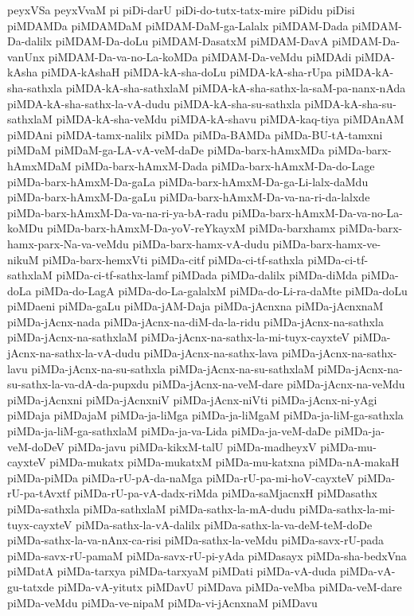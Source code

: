 {peyxVSa
peyxVvaM
pi
piDi-darU
piDi-do-tutx-tatx-mire
piDidu
piDisi
piMDAMDa
piMDAMDaM
piMDAM-DaM-ga-Lalalx
piMDAM-Dada
piMDAM-Da-dalilx
piMDAM-Da-doLu
piMDAM-DasatxM
piMDAM-DavA
piMDAM-Da-vanUnx
piMDAM-Da-va-no-La-koMDa
piMDAM-Da-veMdu
piMDAdi
piMDA-kAsha
piMDA-kAshaH
piMDA-kA-sha-doLu
piMDA-kA-sha-rUpa
piMDA-kA-sha-sathxla
piMDA-kA-sha-sathxlaM
piMDA-kA-sha-sathx-la-saM-pa-nanx-nAda
piMDA-kA-sha-sathx-la-vA-dudu
piMDA-kA-sha-su-sathxla
piMDA-kA-sha-su-sathxlaM
piMDA-kA-sha-veMdu
piMDA-kA-shavu
piMDA-kaq-tiya
piMDAnAM
piMDAni
piMDA-tamx-nalilx
piMDa
piMDa-BAMDa
piMDa-BU-tA-tamxni
piMDaM
piMDaM-ga-LA-vA-veM-daDe
piMDa-barx-hAmxMDa
piMDa-barx-hAmxMDaM
piMDa-barx-hAmxM-Dada
piMDa-barx-hAmxM-Da-do-Lage
piMDa-barx-hAmxM-Da-gaLa
piMDa-barx-hAmxM-Da-ga-Li-lalx-daMdu
piMDa-barx-hAmxM-Da-gaLu
piMDa-barx-hAmxM-Da-va-na-ri-da-lalxde
piMDa-barx-hAmxM-Da-va-na-ri-ya-bA-radu
piMDa-barx-hAmxM-Da-va-no-La-koMDu
piMDa-barx-hAmxM-Da-yoV-reYkayxM
piMDa-barxhamx
piMDa-barx-hamx-parx-Na-va-veMdu
piMDa-barx-hamx-vA-dudu
piMDa-barx-hamx-ve-nikuM
piMDa-barx-hemxVti
piMDa-citf
piMDa-ci-tf-sathxla
piMDa-ci-tf-sathxlaM
piMDa-ci-tf-sathx-lamf
piMDada
piMDa-dalilx
piMDa-diMda
piMDa-doLa
piMDa-do-LagA
piMDa-do-La-galalxM
piMDa-do-Li-ra-daMte
piMDa-doLu
piMDaeni
piMDa-gaLu
piMDa-jAM-Daja
piMDa-jAcnxna
piMDa-jAcnxnaM
piMDa-jAcnx-nada
piMDa-jAcnx-na-diM-da-la-ridu
piMDa-jAcnx-na-sathxla
piMDa-jAcnx-na-sathxlaM
piMDa-jAcnx-na-sathx-la-mi-tuyx-cayxteV
piMDa-jAcnx-na-sathx-la-vA-dudu
piMDa-jAcnx-na-sathx-lava
piMDa-jAcnx-na-sathx-lavu
piMDa-jAcnx-na-su-sathxla
piMDa-jAcnx-na-su-sathxlaM
piMDa-jAcnx-na-su-sathx-la-va-dA-da-pupxdu
piMDa-jAcnx-na-veM-dare
piMDa-jAcnx-na-veMdu
piMDa-jAcnxni
piMDa-jAcnxniV
piMDa-jAcnx-niVti
piMDa-jAcnx-ni-yAgi
piMDaja
piMDajaM
piMDa-ja-liMga
piMDa-ja-liMgaM
piMDa-ja-liM-ga-sathxla
piMDa-ja-liM-ga-sathxlaM
piMDa-ja-va-Lida
piMDa-ja-veM-daDe
piMDa-ja-veM-doDeV
piMDa-javu
piMDa-kikxM-talU
piMDa-madheyxV
piMDa-mu-cayxteV
piMDa-mukatx
piMDa-mukatxM
piMDa-mu-katxna
piMDa-nA-makaH
piMDa-piMDa
piMDa-rU-pA-da-naMga
piMDa-rU-pa-mi-hoV-cayxteV
piMDa-rU-pa-tAvxtf
piMDa-rU-pa-vA-dadx-riMda
piMDa-saMjacnxH
piMDasathx
piMDa-sathxla
piMDa-sathxlaM
piMDa-sathx-la-mA-dudu
piMDa-sathx-la-mi-tuyx-cayxteV
piMDa-sathx-la-vA-dalilx
piMDa-sathx-la-va-deM-teM-doDe
piMDa-sathx-la-va-nAnx-ca-risi
piMDa-sathx-la-veMdu
piMDa-savx-rU-pada
piMDa-savx-rU-pamaM
piMDa-savx-rU-pi-yAda
piMDasayx
piMDa-sha-bedxVna
piMDatA
piMDa-tarxya
piMDa-tarxyaM
piMDati
piMDa-vA-duda
piMDa-vA-gu-tatxde
piMDa-vA-yitutx
piMDavU
piMDava
piMDa-veMba
piMDa-veM-dare
piMDa-veMdu
piMDa-ve-nipaM
piMDa-vi-jAcnxnaM
piMDavu
}
